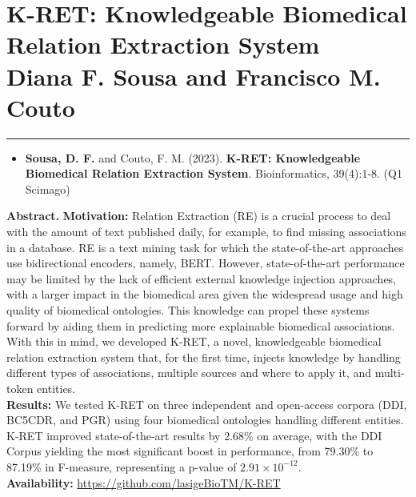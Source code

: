 \hypertarget{5}{}


\chapter[K-RET: Knowledgeable Biomedical Relation Extraction System]
{\huge K-RET: Knowledgeable Biomedical Relation Extraction System \\
\Large \textmd{Diana F. Sousa and Francisco M. Couto}}

\vspace{-1.6cm}

\begingroup
\color{black}
\par\noindent\rule{\textwidth}{0.4pt}
\endgroup


\begin{itemize}[label=]
    \item{\textbf{Sousa, D. F.} and Couto, F. M. (2023). \textbf{K-RET: Knowledgeable Biomedical Relation Extraction System}. Bioinformatics, 39(4):1-8. (Q1 Scimago) \citep{sousa2023k}}
\end{itemize}

\textbf{Abstract.} \textbf{Motivation:} Relation Extraction (RE) is a crucial process to deal with the amount of text published daily, for example, to find missing associations in a database. RE is a text mining task for which the state-of-the-art approaches use bidirectional encoders, namely, BERT. However, state-of-the-art performance may be limited by the lack of efficient external knowledge injection approaches, with a larger impact in the biomedical area given the widespread usage and high quality of biomedical ontologies. This knowledge can propel these systems forward by aiding them in predicting more explainable biomedical associations. With this in mind, we developed K-RET, a novel, knowledgeable biomedical relation extraction system that, for the first time, injects knowledge by handling different types of associations, multiple sources and where to apply it, and multi-token entities.\\
\textbf{Results:} We tested K-RET on three independent and open-access corpora (DDI, BC5CDR, and PGR) using four biomedical ontologies handling different entities. K-RET improved state-of-the-art results by 2.68\% on average, with the DDI Corpus yielding the most significant boost in performance, from 79.30\% to 87.19\% in F-measure, representing a p-value of $2.91 \times 10^{-12}$.\\
\textbf{Availability:} \url{https://github.com/lasigeBioTM/K-RET}


